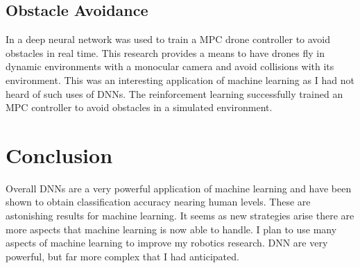 \documentclass[font=12pt]{article}
\begin{document}
\subsection{Obstacle Avoidance}
In \cite{DBLP:journals/corr/ZhangKLA15} a deep neural network was used to train a MPC drone controller to avoid obstacles in real time. This research provides a means to have drones fly in dynamic environments with a monocular camera and avoid collisions with its environment. This was an interesting application of machine learning as I had not heard of such uses of DNNs. The reinforcement learning successfully trained an MPC controller to avoid obstacles in a simulated environment.

\section{Conclusion}
Overall DNNs are a very powerful application of machine learning and have been shown to obtain classification accuracy nearing human levels. These are astonishing results for machine learning. It seems as new strategies arise there are more aspects that machine learning is now able to handle. I plan to use many aspects of machine learning to improve my robotics research. DNN are very powerful, but far more complex that I had anticipated.



\end{document}
